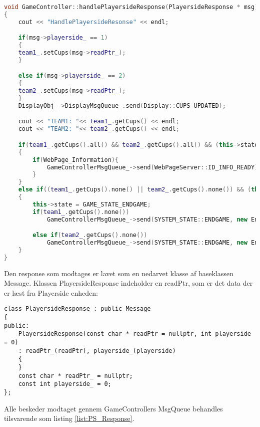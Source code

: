 \documentclass[Softwaredesign/Softwaredesign_main.tex]{subfiles}
\begin{document}
\begin{lstlisting}[language=C++, caption={Håndtering af PlayersideResponse}, label=list:PS_Response]
void GameController::handlePlayersideResponse(PlayersideResponse * msg)
{
	cout << "HandlePlayersideResonse" << endl;

	if(msg->playerside_ == 1)
	{
	team1_.setCups(msg->readPtr_);
    }

	else if(msg->playerside_ == 2)
	{
	team2_.setCups(msg->readPtr_);
	}
    DisplayObj_->DisplayMsgQueue_.send(Display::CUPS_UPDATED);

	cout << "TEAM1: "<< team1_.getCups() << endl;
	cout << "TEAM2: "<< team2_.getCups() << endl;

	if(team1_.getCups().all() && team2_.getCups().all() && (this->state == GAME_STATE_STARTING))
	{
		if(WebPage_Information){
			GameControllerMsgQueue_->send(WebPageServer::ID_INFO_READY);
		}
	}
	else if((team1_.getCups().none() || team2_.getCups().none()) && (this->state == GAME_STATE_PLAYING))
	{
		this->state = GAME_STATE_ENDGAME;
		if(team1_.getCups().none())
			GameControllerMsgQueue_->send(SYSTEM_STATE::ENDGAME, new EndGameCfm(1));

		else if(team2_.getCups().none())
			GameControllerMsgQueue_->send(SYSTEM_STATE::ENDGAME, new EndGameCfm(2));
	}
}
\end{lstlisting}
Den response som modtages er lavet som en nedarvet klasse af baseklassen Message. Klassen PlayersideResponse indeholder en readPtr, som er det data der er læst fra Playerside enheden: 
\begin{lstlisting}[caption={PlayersideResponse klasse}, label=list:Response_Class]
class PlayersideResponse : public Message
{
public:
	PlayersideResponse(const char * readPtr = nullptr, int playerside = 0)
	: readPtr_(readPtr), playerside_(playerside)
	{
	}
	const char * readPtr_ = nullptr;
	const int playerside_ = 0;
};
\end{lstlisting}

Alle beskeder modtaget gennem GameControllers MsgQueue behandles tilsvarende som listing \ref{list:PS_Response}. 
\end{document}
